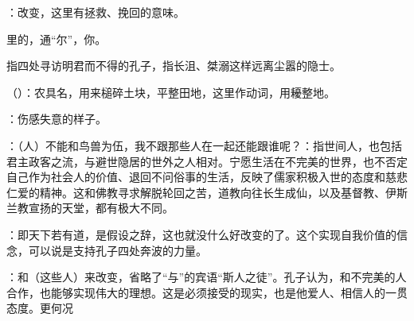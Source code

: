 {：改变，这里有拯救、挽回的意味。
\item {}里的，通“尔”，你。
\item {}指四处寻访明君而不得的孔子，指长沮、桀溺这样远离尘嚣的隐士。
\item {}（）：农具名，用来槌碎土块，平整田地，这里作动词，用耰整地。
\item {}：伤感失意的样子。
\item {}：（人）不能和鸟兽为伍，我不跟那些人在一起还能跟谁呢？：指世间人，也包括君主政客之流，与避世隐居的世外之人相对。宁愿生活在不完美的世界，也不否定自己作为社会人的价值、退回不问俗事的生活，反映了儒家积极入世的态度和慈悲仁爱的精神。这和佛教寻求解脱轮回之苦，道教向往长生成仙，以及基督教、伊斯兰教宣扬的天堂，都有极大不同。
\item {}：即天下若有道，是假设之辞，这也就没什么好改变的了。这个实现自我价值的信念，可以说是支持孔子四处奔波的力量。
\item {}：和（这些人）来改变，省略了“与”的宾语“斯人之徒”。孔子认为，和不完美的人合作，也能够实现伟大的理想。这是必须接受的现实，也是他爱人、相信人的一贯态度。更何况  
}
{}  %


